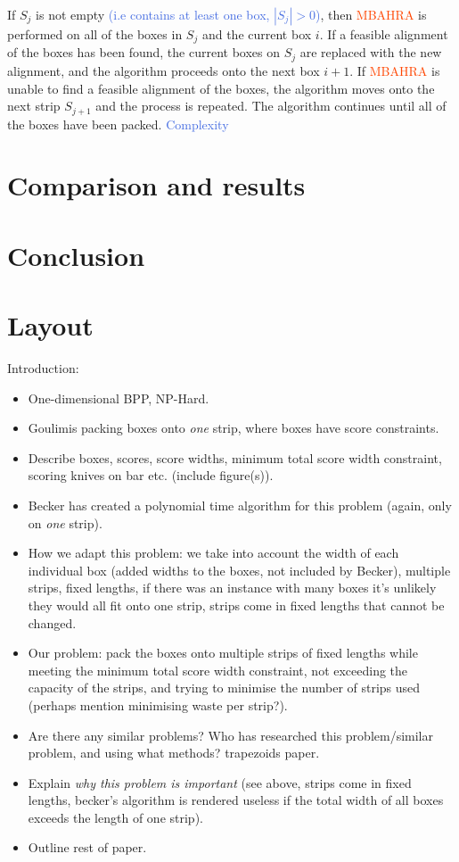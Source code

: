 \documentclass[oribibl]{llncs}
\begin{document}
If $S_j$ is not empty \textcolor{RoyalBlue}{(i.e contains at least one box, $|S_j| > 0$)}, then \textcolor{OrangeRed}{MBAHRA} is performed on all of the boxes in $S_j$ and the current box $i$. If a feasible alignment of the boxes has been found, the current boxes on $S_j$ are replaced with the new alignment, and the algorithm proceeds onto the next box $i+1$. If \textcolor{OrangeRed}{MBAHRA} is unable to find a feasible alignment of the boxes, the algorithm moves onto the next strip $S_{j+1}$ and the process is repeated. The algorithm continues until all of the boxes have been packed. \textcolor{RoyalBlue}{Complexity}




\section{Comparison and results}
\label{sec:comparison}

\section{Conclusion}
\label{sec:conclusion}


\section{Layout}
Introduction:
\begin{itemize}
	\item One-dimensional BPP, NP-Hard.
	\item Goulimis packing boxes onto \textit{one} strip, where boxes have score constraints.
	\item Describe boxes, scores, score widths, minimum total score width constraint, scoring knives on bar etc. (include figure(s)).
	\item Becker has created a polynomial time algorithm for this problem (again, only on \textit{one} strip).
	\item How we adapt this problem: we take into account the width of each individual box (added widths to the boxes, not included by Becker), multiple strips, fixed lengths, if there was an instance with many boxes it's unlikely they would all fit onto one strip, strips come in fixed lengths that cannot be changed.
	\item Our problem: pack the boxes onto multiple strips of fixed lengths while meeting the minimum total score width constraint, not exceeding the capacity of the strips, and trying to minimise the number of strips used (perhaps mention minimising waste per strip?).
	\item Are there any similar problems? Who has researched this problem/similar problem, and using what methods? \cite{lewis2017} trapezoids paper. 
	\item Explain \textit{why this problem is important} (see above, strips come in fixed lengths, becker's algorithm is rendered useless if the total width of all boxes exceeds the length of one strip).
	\item Outline rest of paper.	
\end{itemize}
\end{document}
